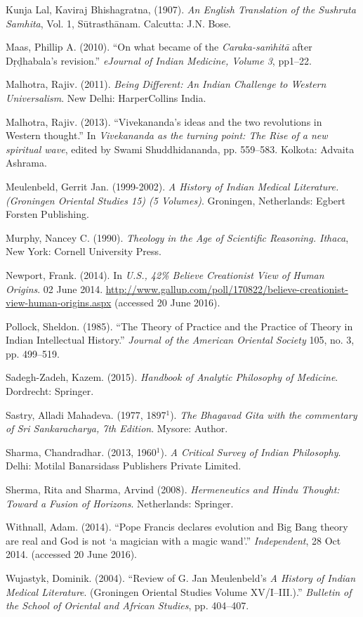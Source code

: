 \begin{thebibliography}{99}
Kunja Lal, Kaviraj Bhishagratna, (1907). {\sl An English Translation of the Sushruta Samhita}, Vol. 1, Sūtrasthānam. Calcutta: J.N. Bose.

Maas, Phillip A. (2010). ``On what became of the {\sl Caraka-saṁhitā} after Dṛḍhabala's revision.'' {\sl eJournal of Indian Medicine, Volume 3}, pp1--22.

Malhotra, Rajiv. (2011). {\sl Being Different: An Indian Challenge to Western Universalism}. New Delhi: HarperCollins India.

Malhotra, Rajiv. (2013). ``Vivekananda's ideas and the two revolutions in Western thought.'' In {\sl Vivekananda as the turning point: The Rise of a new spiritual wave}, edited by Swami Shuddhidananda, pp. 559--583. Kolkota: Advaita Ashrama.

Meulenbeld, Gerrit Jan. (1999-2002). {\sl A History of Indian Medical Literature. (Groningen Oriental Studies 15) (5 Volumes)}. Groningen, Netherlands: Egbert Forsten Publishing.

Murphy, Nancey C. (1990). {\sl Theology in the Age of Scientific Reasoning. Ithaca}, New York: Cornell University Press.

Newport, Frank. (2014). In {\sl U.S., 42\% Believe Creationist View of Human Origins}. 02 June 2014. \url{http://www.gallup.com/poll/170822/believe-creationist-view-human-origins.aspx} (accessed 20 June 2016).

Pollock, Sheldon. (1985). ``The Theory of Practice and the Practice of Theory in Indian Intellectual History.'' {\sl Journal of the American Oriental Society} 105, no. 3, pp. 499--519.

Sadegh-Zadeh, Kazem. (2015). {\sl Handbook of Analytic Philosophy of Medicine}. Dordrecht: Springer.

Sastry, Alladi Mahadeva. (1977, 1897$^1$). {\sl The Bhagavad Gita with the commentary of Sri Sankaracharya, 7th Edition}. Mysore: Author.

Sharma, Chandradhar. (2013, 1960$^{1}$). {\sl A Critical Survey of Indian Philosophy}. Delhi: Motilal Banarsidass Publishers Private Limited.

Sherma, Rita and Sharma, Arvind (2008). {\sl Hermeneutics and Hindu Thought: Toward a Fusion of Horizons}. Netherlands: Springer.

Withnall, Adam. (2014). ``Pope Francis declares evolution and Big Bang theory are real and God is not `a magician with a magic wand'.'' {\sl Independent}, 28 Oct 2014. (accessed 20 June 2016).

Wujastyk, Dominik. (2004). ``Review of G. Jan Meulenbeld's {\sl A History of Indian Medical Literature}. (Groningen Oriental Studies Volume XV/I--III.).'' {\sl Bulletin of the School of Oriental and African Studies}, pp. 404--407.
\end{thebibliography}

\theendnotes
\label{chapter\thechapter:end}
